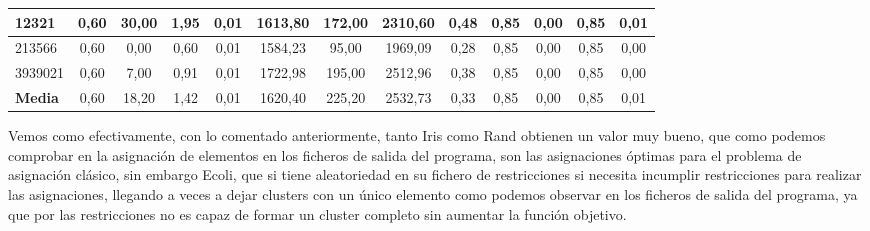 \documentclass[12pt, spanish]{article}
\begin{document}
\begin{table}[H]
\begin{adjustwidth}{-1cm}{-1cm}
\begin{tabular}{|l|c|c|c|c|c|c|c|c|c|c|c|c|}
12321                                                   & 0,60                         & 30,00                          & 1,95                      & 0,01                   & 1613,80                      & 172,00                         & 2310,60                   & 0,48                   & 0,85                         & 0,00                           & 0,85                      & 0,01                   \\ \hline
213566                                                  & 0,60                         & 0,00                           & 0,60                      & 0,01                   & 1584,23                      & 95,00                          & 1969,09                   & 0,28                   & 0,85                         & 0,00                           & 0,85                      & 0,00                   \\ \hline
3939021                                                 & 0,60                         & 7,00                           & 0,91                      & 0,01                   & 1722,98                      & 195,00                         & 2512,96                   & 0,38                   & 0,85                         & 0,00                           & 0,85                      & 0,00                   \\ \hline
\textbf{Media}                                          & 0,60                         & 18,20                          & 1,42                      & 0,01                   & 1620,40                      & 225,20                         & 2532,73                   & 0,33                   & 0,85                         & 0,00                           & 0,85                      & 0,01                   \\ \hline
\end{tabular}

\end{adjustwidth}

\end{table}


Vemos como efectivamente, con lo comentado anteriormente, tanto Iris como Rand obtienen un valor muy bueno, que como podemos comprobar en la asignación de elementos en los ficheros de salida del programa, son las asignaciones óptimas para el problema de asignación clásico, sin embargo Ecoli, que si tiene aleatoriedad en su fichero de restricciones si necesita incumplir restricciones para realizar las asignaciones, llegando a veces a dejar clusters con un único elemento como podemos observar en los ficheros de salida del programa, ya que por las restricciones no es capaz de formar un cluster completo sin aumentar la función objetivo.
\end{document}
